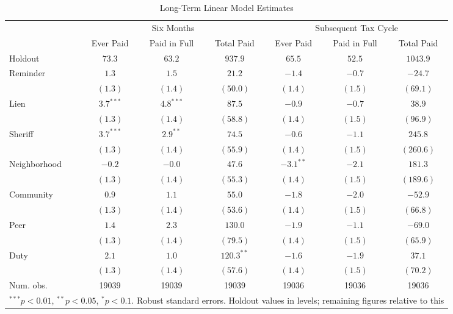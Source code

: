 \begin{table}[htb]
\caption{Long-Term Linear Model Estimates}
\begin{center}
\begin{tabular}{l c c c c c c }
\hline
 & \multicolumn{3}{c}{Six Months} & \multicolumn{3}{c}{Subsequent Tax Cycle} \\
 & Ever Paid & Paid in Full & Total Paid & Ever Paid & Paid in Full & Total Paid \\
Holdout      & $73.3$ & $63.2$ & $937.9$ & $65.5$ & $52.5$ & $1043.9$ \\
\hline
Reminder     & $1.3$        & $1.5$        & $21.2$        & $-1.4$       & $-0.7$       & $-24.7$        \\
             & $(1.3)$      & $(1.4)$      & $(50.0)$      & $(1.4)$      & $(1.5)$      & $(69.1)$       \\
Lien         & $3.7^{***}$  & $4.8^{***}$  & $87.5$        & $-0.9$       & $-0.7$       & $38.9$         \\
             & $(1.3)$      & $(1.4)$      & $(58.8)$      & $(1.4)$      & $(1.5)$      & $(96.9)$       \\
Sheriff      & $3.7^{***}$  & $2.9^{**}$   & $74.5$        & $-0.6$       & $-1.1$       & $245.8$        \\
             & $(1.3)$      & $(1.4)$      & $(55.9)$      & $(1.4)$      & $(1.5)$      & $(260.6)$      \\
Neighborhood & $-0.2$       & $-0.0$       & $47.6$        & $-3.1^{**}$  & $-2.1$       & $181.3$        \\
             & $(1.3)$      & $(1.4)$      & $(55.3)$      & $(1.4)$      & $(1.5)$      & $(189.6)$      \\
Community    & $0.9$        & $1.1$        & $55.0$        & $-1.8$       & $-2.0$       & $-52.9$        \\
             & $(1.3)$      & $(1.4)$      & $(53.6)$      & $(1.4)$      & $(1.5)$      & $(66.8)$       \\
Peer         & $1.4$        & $2.3$        & $130.0$       & $-1.9$       & $-1.1$       & $-69.0$        \\
             & $(1.3)$      & $(1.4)$      & $(79.5)$      & $(1.4)$      & $(1.5)$      & $(65.9)$       \\
Duty         & $2.1$        & $1.0$        & $120.3^{**}$  & $-1.6$       & $-1.9$       & $37.1$         \\
             & $(1.3)$      & $(1.4)$      & $(57.6)$      & $(1.4)$      & $(1.5)$      & $(70.2)$       \\
\hline
Num. obs.    & 19039        & 19039        & 19039         & 19036        & 19036        & 19036          \\
\hline
\multicolumn{7}{l}{\scriptsize{$^{***}p<0.01$, $^{**}p<0.05$, $^*p<0.1$. Robust standard errors. Holdout values in levels; remaining figures relative to this}}
\end{tabular}
\label{ltmpme}
\end{center}
\end{table}
